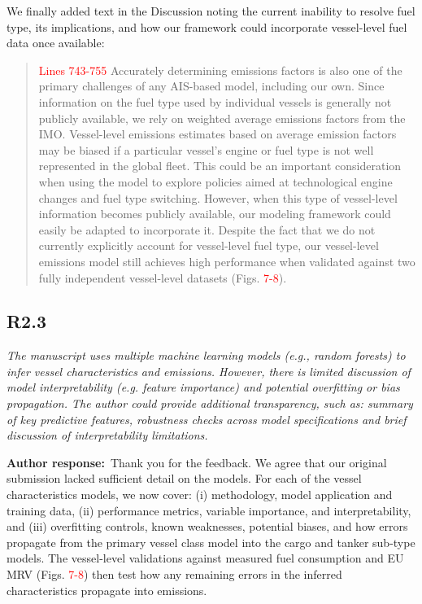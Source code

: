 \documentclass[11pt]{article}
\newcommand{\point}[1]{\subsection*{\normalfont\bfseries #1}}
\newcommand{\response}{\par\medskip\noindent%
  \textbf{\textcolor{respblue}{Author response:}}\ }
\begin{document}
We finally added text in the Discussion noting the current inability to resolve fuel type, its implications, and how our framework could incorporate vessel-level fuel data once available:

\begin{quote}
 \textcolor{red}{Lines 743-755} Accurately determining emissions factors is also one of the primary challenges of any AIS-based model, including our own. Since information on the fuel type used by individual vessels is generally not publicly available, we rely on weighted average emissions factors from the IMO. Vessel-level emissions estimates based on average emission factors may be biased if a particular vessel's engine or fuel type is not well represented in the global fleet. This could be an important consideration when using the model to explore policies aimed at technological engine changes and fuel type switching. However, when this type of vessel-level information becomes publicly available, our modeling framework could easily be adapted to incorporate it. Despite the fact that we do not currently explicitly account for vessel-level fuel type, our vessel-level emissions model still achieves high performance when validated against two fully independent vessel-level datasets (Figs. \textcolor{red}{7-8}).
\end{quote}

\point{R2.3}

\begin{refquote}\itshape
The manuscript uses multiple machine learning models (e.g., random forests) to
infer vessel characteristics and emissions. However, there is limited discussion
of model interpretability (e.g. feature importance) and potential overfitting or
bias propagation. The author could provide additional transparency, such as:
summary of key predictive features, robustness checks across model
specifications and brief discussion of interpretability limitations.
\end{refquote}

\response Thank you for the feedback. We agree that our original submission lacked sufficient detail on the models. For each of the vessel characteristics models, we now cover: (i) methodology, model application and training data, (ii) performance metrics, variable importance, and interpretability, and (iii) overfitting controls, known weaknesses, potential biases, and how errors propagate from the primary vessel class model into the cargo and tanker sub-type models. The vessel-level validations against measured fuel consumption and EU MRV (Figs. \textcolor{red}{7-8}) then test how any remaining errors in the inferred characteristics propagate into emissions.
\end{document}
